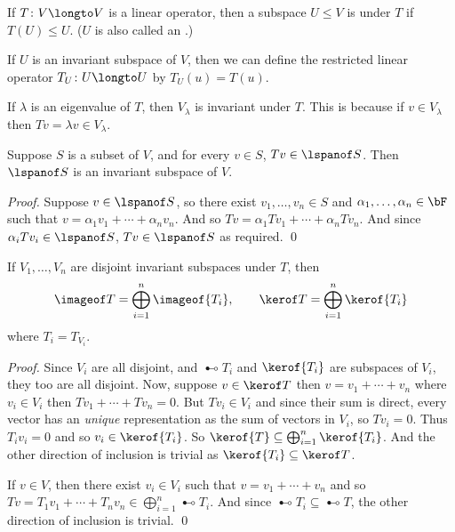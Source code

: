 \begin{defn*}

    If $T\colon V\longto V$ is a linear operator, then a subspace $U\leq V$ is  under $T$ if $T(U)\leq U$.
    ($U$ is also called an .)

\end{defn*}

If $U$ is an invariant subspace of $V$, then we can define the restricted linear operator $T_U\colon U\longto U$ by $T_U(u)=T(u)$.

\begin{exam*}

    If $\lambda$ is an eigenvalue of $T$, then $V_\lambda$ is invariant under $T$.
    This is because if $v\in V_\lambda$ then $Tv=\lambda v\in V_\lambda$.

\end{exam*}

\begin{prop*}[invariantSpan]

    Suppose $S$ is a subset of $V$, and for every $v\in S$, $Tv\in\lspanof S$.
    Then $\lspanof S$ is an invariant subspace of $V$.

\end{prop*}

\begin{proof}

    Suppose $v\in\lspanof S$, so there exist $v_1,\dots,v_n\in S$ and $\alpha_1,\dots,\alpha_n\in\bF$ such that $v=\alpha_1v_1+\cdots+\alpha_nv_n$.
    And so $Tv=\alpha_1Tv_1+\cdots+\alpha_nTv_n$.
    And since $\alpha_iTv_i\in\lspanof S$, $Tv\in\lspanof S$ as required.
    \qed

\end{proof}

\begin{prop*}

    If $V_1,\dots,V_n$ are disjoint invariant subspaces under $T$, then
    \[ \imageof T = \bigoplus_{i=1}^n \imageof{T_i},\qquad \kerof T = \bigoplus_{i=1}^n \kerof{T_i} \]
    where $T_i=T_{V_i}$.

\end{prop*}

\begin{proof}

    Since $V_i$ are all disjoint, and $\imageof{T_i}$ and $\kerof{T_i}$ are subspaces of $V_i$, they too are all disjoint.
    Now, suppose $v\in\kerof T$ then $v=v_1+\cdots+v_n$ where $v_i\in V_i$ then $Tv_1+\cdots+Tv_n=0$.
    But $Tv_i\in V_i$ and since their sum is direct, every vector has an \emph{unique} representation as the sum of vectors in $V_i$, so $Tv_i=0$.
    Thus $T_iv_i=0$ and so $v_i\in\kerof{T_i}$.
    So $\kerof{T}\subseteq\bigoplus_{i=1}^n\kerof{T_i}$.
    And the other direction of inclusion is trivial as $\kerof{T_i}\subseteq\kerof T$.

    If $v\in V$, then there exist $v_i\in V_i$ such that $v=v_1+\cdots+v_n$ and so $Tv=T_1v_1+\cdots+T_nv_n\in\bigoplus_{i=1}^n\imageof{T_i}$.
    And since $\imageof{T_i}\subseteq\imageof T$, the other direction of inclusion is trivial.
    \qed

\end{proof}

